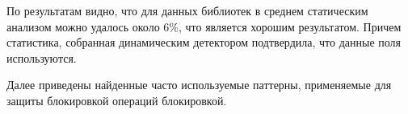 По результатам видно, что для данных библиотек  в среднем статическим анализом можно удалось около 6\%, что является  хорошим результатом. Причем статистика, собранная динамическим детектором подтвердила, что данные поля используются.

Далее приведены найденные часто используемые паттерны, применяемые для защиты блокировкой операций блокировкой.
\\
\\





\FloatBarrier
